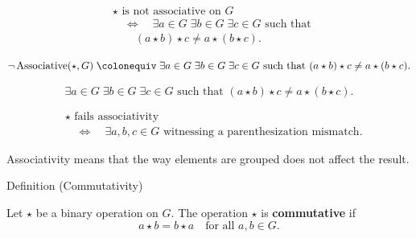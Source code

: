 \begin{remark*}
\[
\begin{aligned}
&\star \text{ is not associative on } G \\
&\quad\Longleftrightarrow\quad
\exists a \in G\;\exists b \in G\;\exists c \in G \text{ such that } \\
&\qquad (a \star b) \star c \ne a \star (b \star c).
\end{aligned}
\]
\end{remark*}

\begin{remark*}
\[
\neg \operatorname{Associative}(\star, G)
\;\colonequiv\;
\exists a \in G\;\exists b \in G\;\exists c \in G \text{ such that }
(a \star b) \star c \ne a \star (b \star c).
\]
\end{remark*}

\begin{remark*}
\[
\exists a \in G\;\exists b \in G\;\exists c \in G \text{ such that }
(a \star b) \star c \ne a \star (b \star c).
\]
\end{remark*}

\begin{remark*}
\[
\begin{aligned}
&\star \text{ fails associativity} \\
&\quad\Longleftrightarrow\quad
\exists a,b,c \in G \text{ witnessing a parenthesization mismatch.}
\end{aligned}
\]
\end{remark*}

\begin{remark*}[Interpretation]
Associativity means that the way elements are grouped does not affect the result.
\end{remark*}


\begin{definitionbox}{Definition (Commutativity)}
\begin{definition}[Commutativity]
\label{def:algebraic-group-commutativity}
Let $\star$ be a binary operation on $G$. The operation $\star$ is
\textbf{commutative} if
\[
a \star b = b \star a
\quad \text{for all } a, b \in G.
\]
\end{definition}
\end{definitionbox}

